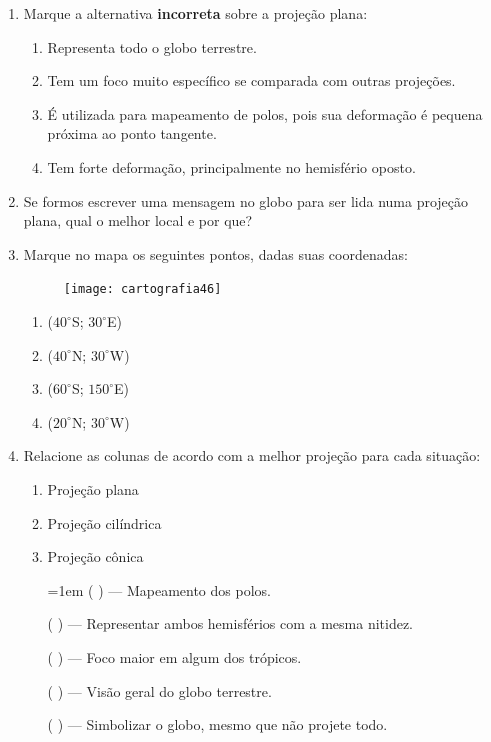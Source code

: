 \begin{enumerate}
\item Marque a alternativa \textbf{incorreta} sobre a projeção plana:
\begin{enumerate}
\item Representa todo o globo terrestre.
\item Tem um foco muito específico se comparada com outras projeções.
\item É utilizada para mapeamento de polos, pois sua deformação é pequena próxima ao ponto tangente.
\item Tem forte deformação, principalmente no hemisfério oposto.
\end{enumerate}

\item Se formos escrever uma mensagem no globo para ser lida numa projeção plana, qual o melhor local e por que?

\item Marque no mapa os seguintes pontos, dadas suas coordenadas:

\begin{figure}[H]
\centering
\texttt{[image: cartografia46]}

\end{figure}

\begin{enumerate}
\item ($40^{\circ}$S; $30^{\circ}$E)
\item ($40^{\circ}$N; $30^{\circ}$W)
\item ($60^{\circ}$S; $150^{\circ}$E)
\item ($20^{\circ}$N; $30^{\circ}$W)
\end{enumerate}

\item Relacione as colunas de acordo com a melhor projeção para cada situação:

\begin{multicols}{2}
\begin{enumerate}
\item Projeção plana
\item Projeção cilíndrica
\item Projeção cônica

\columnbreak

\parskip=1em
({ }{ }{ }) --- Mapeamento dos polos.

({ }{ }) --- Representar ambos hemisférios com a mesma nitidez.

({ }{ }{ }) --- Foco maior em algum dos trópicos.

({ }{ }{ }) --- Visão geral do globo terrestre.

({ }{ }{ }) --- Simbolizar o globo, mesmo que não projete todo.
\end{enumerate}

\end{multicols}

\end{enumerate}








